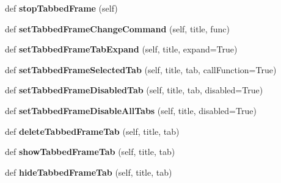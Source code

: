 \begin{DoxyCompactItemize}
\item 
\mbox{\label{class_python_01_g_u_i_1_1appjar_1_1gui_a5aaae886635f846db927f5da2e227892}} 
def {\bfseries stop\+Tabbed\+Frame} (self)
\item 
\mbox{\label{class_python_01_g_u_i_1_1appjar_1_1gui_ad8c015830e352b87f0f643abafbfc724}} 
def {\bfseries set\+Tabbed\+Frame\+Change\+Command} (self, title, func)
\item 
\mbox{\label{class_python_01_g_u_i_1_1appjar_1_1gui_ae79e4a2efcd4806dde732eac4695d160}} 
def {\bfseries set\+Tabbed\+Frame\+Tab\+Expand} (self, title, expand=True)
\item 
\mbox{\label{class_python_01_g_u_i_1_1appjar_1_1gui_aefa6b23a471da8f716037346166baa8a}} 
def {\bfseries set\+Tabbed\+Frame\+Selected\+Tab} (self, title, tab, call\+Function=True)
\item 
\mbox{\label{class_python_01_g_u_i_1_1appjar_1_1gui_a0763311b86185951453c1b402e513ed3}} 
def {\bfseries set\+Tabbed\+Frame\+Disabled\+Tab} (self, title, tab, disabled=True)
\item 
\mbox{\label{class_python_01_g_u_i_1_1appjar_1_1gui_a79064f5ac8ae3f1b4fa89585fa71d089}} 
def {\bfseries set\+Tabbed\+Frame\+Disable\+All\+Tabs} (self, title, disabled=True)
\item 
\mbox{\label{class_python_01_g_u_i_1_1appjar_1_1gui_a5589a4d284bcc373c7409155943708f4}} 
def {\bfseries delete\+Tabbed\+Frame\+Tab} (self, title, tab)
\item 
\mbox{\label{class_python_01_g_u_i_1_1appjar_1_1gui_a4c1c73d76e1ddab797775c0f2e727239}} 
def {\bfseries show\+Tabbed\+Frame\+Tab} (self, title, tab)
\item 
\mbox{\label{class_python_01_g_u_i_1_1appjar_1_1gui_a680f6c88833562d4dd225cdad691c4b9}} 
def {\bfseries hide\+Tabbed\+Frame\+Tab} (self, title, tab)

\end{DoxyCompactItemize}
